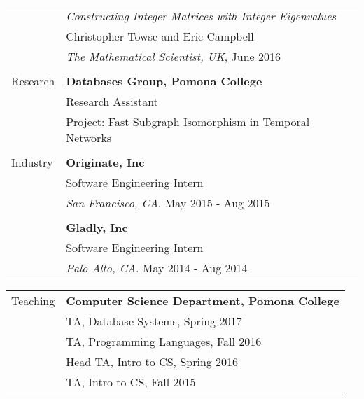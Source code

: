 \documentclass[letterpaper,11pt,oneside]{article}
\begin{document}
\begin{tabular}{@{} l l}
    & \textit{Constructing Integer Matrices with Integer Eigenvalues} \\
    & Christopher Towse and Eric Campbell \\
    & \textit{The Mathematical Scientist, UK}, June 2016
 \\
    & \\


 
  \Large{Research}    & \textbf{Databases Group, Pomona College} \\ 
     & Research Assistant \\
     & Project: Fast Subgraph Isomorphism in Temporal Networks  \\
     & \\
  \Large{Industry} & \textbf{Originate, Inc} \\
     & Software Engineering Intern \\
     & \textit{San Francisco, CA}. May 2015 - Aug 2015 \\
     & \\
     & \textbf{Gladly, Inc} \\
     & Software Engineering Intern \\
     & \textit{Palo Alto, CA}. May 2014 - Aug 2014 \\
\end{tabular}

\begin{tabular}{@{} l l}
  \Large{Teaching}      & \textbf{Computer Science Department, Pomona College} \\

     & TA, Database Systems, Spring 2017 \\

     & TA, Programming Languages, Fall 2016 \\

     & Head TA, Intro to CS, Spring 2016 \\

     & TA, Intro to CS, Fall 2015 \\


\end{tabular}
\end{document}

